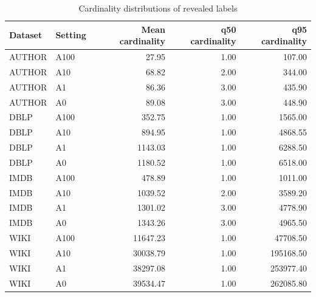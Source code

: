 \begin{table}[H]
\centering
\small
\setlength{\tabcolsep}{5pt}
\caption{Cardinality distributions of revealed labels}
\label{tab:A_sampling_shift}
\begin{tabular}{@{}llrrr@{}}
\toprule
Dataset & Setting & Mean cardinality & q50 cardinality & q95 cardinality \\
\midrule
AUTHOR & A100 & 27.95 & 1.00 & 107.00 \\
AUTHOR & A10 & 68.82 & 2.00 & 344.00 \\
AUTHOR & A1 & 86.36 & 3.00 & 435.90 \\
AUTHOR & A0 & 89.08 & 3.00 & 448.90 \\
DBLP & A100 & 352.75 & 1.00 & 1565.00 \\
DBLP & A10 & 894.95 & 1.00 & 4868.55 \\
DBLP & A1 & 1143.03 & 1.00 & 6288.50 \\
DBLP & A0 & 1180.52 & 1.00 & 6518.00 \\
IMDB & A100 & 478.89 & 1.00 & 1011.00 \\
IMDB & A10 & 1039.52 & 2.00 & 3589.20 \\
IMDB & A1 & 1301.02 & 3.00 & 4778.90 \\
IMDB & A0 & 1343.26 & 3.00 & 4965.50 \\
WIKI & A100 & 11647.23 & 1.00 & 47708.50 \\
WIKI & A10 & 30038.79 & 1.00 & 195168.50 \\
WIKI & A1 & 38297.08 & 1.00 & 253977.40 \\
WIKI & A0 & 39534.47 & 1.00 & 262085.80 \\
\bottomrule
\end{tabular}
\end{table}
